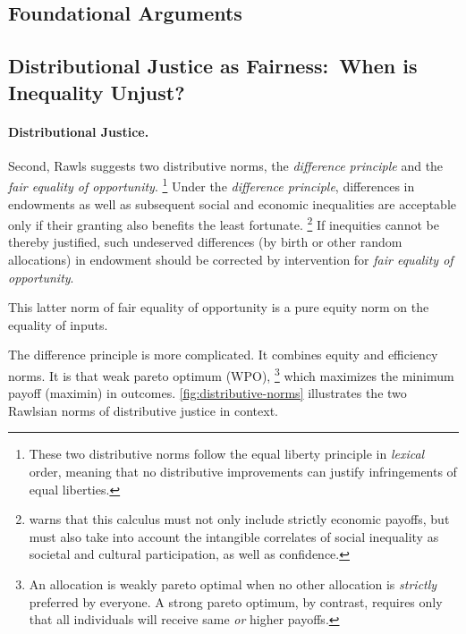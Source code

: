 

\subsection[Foundational Arguments]{Foundational Arguments}

\subsection[Distributional Justice (as Fairness)]{Distributional Justice as Fairness:~When is Inequality Unjust?}
\paragraph{Distributional Justice.}
Second, Rawls suggests two distributive norms, the \emph{difference principle} and the \emph{fair equality of opportunity}.
\footnote{
	These two distributive norms follow the equal liberty principle in \emph{lexical} order, meaning that no distributive improvements can justify infringements of equal liberties.
}
Under the \emph{difference principle}, differences in endowments as well as subsequent social and economic inequalities are acceptable only if their granting also benefits the least fortunate.
\footnote{
	\cite[122]{Rawls-1971} warns that this calculus must not only include strictly economic payoffs, but must also take into account the intangible correlates of social inequality as societal and cultural participation, as well as confidence.
}
If inequities cannot be thereby justified, such undeserved differences (by birth or other random allocations) in endowment should be corrected by intervention for \emph{fair equality of opportunity}.

This latter norm of fair equality of opportunity is a pure equity norm on the equality of inputs.

The difference principle is more complicated.
It combines equity and efficiency norms.
It is that weak pareto optimum (WPO),
\footnote{
	An allocation is weakly pareto optimal when no other allocation is \emph{strictly} preferred by everyone.
A strong pareto optimum, by contrast, requires only that all individuals will receive same \emph{or} higher payoffs.
}
which maximizes the minimum payoff (maximin) in outcomes.
\autoref{fig:distributive-norms} illustrates the two Rawlsian norms of distributive justice in context.

